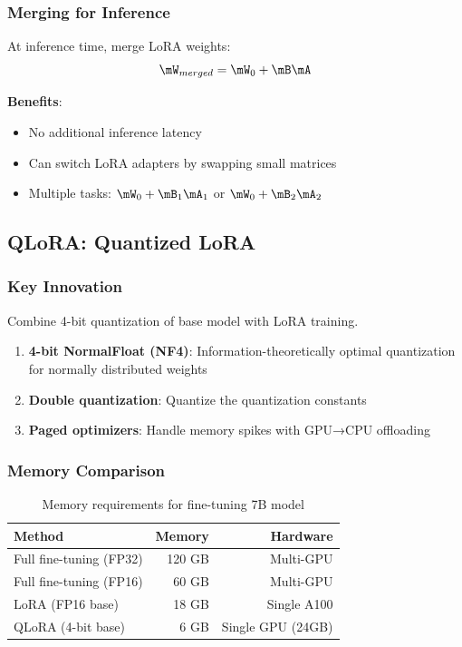 \subsubsection{Merging for Inference}

At inference time, merge LoRA weights:
\begin{equation}
\mW_{merged} = \mW_0 + \mB \mA
\end{equation}

\textbf{Benefits}:
\begin{itemize}
    \item No additional inference latency
    \item Can switch LoRA adapters by swapping small matrices
    \item Multiple tasks: $\mW_0 + \mB_1 \mA_1$ or $\mW_0 + \mB_2 \mA_2$
\end{itemize}

\subsection{QLoRA: Quantized LoRA}

\subsubsection{Key Innovation}

Combine 4-bit quantization of base model with LoRA training.

\begin{enumerate}
    \item \textbf{4-bit NormalFloat (NF4)}: Information-theoretically optimal quantization for normally distributed weights
    
    \item \textbf{Double quantization}: Quantize the quantization constants
    
    \item \textbf{Paged optimizers}: Handle memory spikes with GPU→CPU offloading
\end{enumerate}

\subsubsection{Memory Comparison}

\begin{table}[H]
\centering
\caption{Memory requirements for fine-tuning 7B model}
\begin{tabular}{lrr}
\toprule
\textbf{Method} & \textbf{Memory} & \textbf{Hardware} \\
\midrule
Full fine-tuning (FP32) & ~120 GB & Multi-GPU \\
Full fine-tuning (FP16) & ~60 GB & Multi-GPU \\
LoRA (FP16 base) & ~18 GB & Single A100 \\
QLoRA (4-bit base) & ~6 GB & Single GPU (24GB) \\
\bottomrule
\end{tabular}
\end{table}

